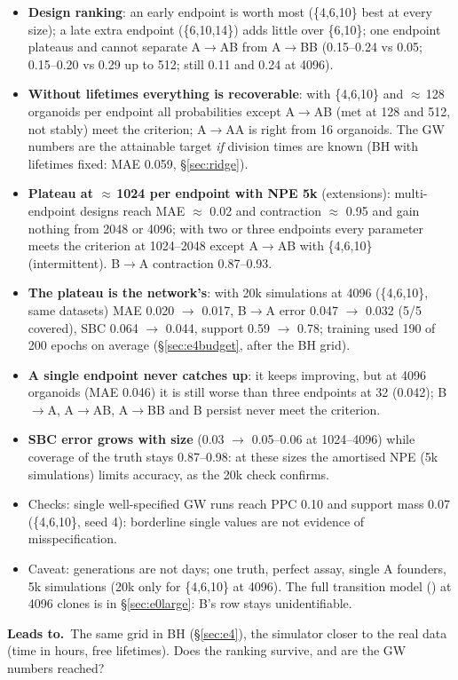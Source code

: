 \documentclass[10pt,a4paper]{article}
\newcommand{\code}[1]{\texttt{\detokenize{#1}}}
\newcommand{\blk}[1]{\par\needspace{5\baselineskip}\smallskip{\sffamily\bfseries\color{inkgray}#1}\par}
\newcommand{\Comment}{\blk{Comment}}
\newcommand{\Leads}[1]{\begin{leadbox}{\sffamily\bfseries\color{caqua!70!black}Leads to.}\ #1\end{leadbox}}
\renewcommand{\blk}[1]{\par\Needspace*{5\baselineskip}\smallskip{\sffamily\bfseries\color{inkgray}#1}\par}
\newcommand{\sref}[1]{\S\ref{#1}}
\begin{document}
\Comment
\begin{itemize}
\item \textbf{Design ranking}: an early endpoint is worth most (\{4,6,10\} best at every size); a late extra endpoint (\{6,10,14\}) adds little over \{6,10\}; one endpoint plateaus and cannot separate A$\to$AB from A$\to$BB (0.15--0.24 vs 0.05; 0.15--0.20 vs 0.29 up to 512; still 0.11 and 0.24 at 4096).
\item \textbf{Without lifetimes everything is recoverable}: with \{4,6,10\} and $\approx$\,128 organoids per endpoint all probabilities except A$\to$AB (met at 128 and 512, not stably) meet the criterion; A$\to$AA is right from 16 organoids. The GW numbers are the attainable target \emph{if} division times are known (BH with lifetimes fixed: MAE 0.059, \S\ref{sec:ridge}).
\item \textbf{Plateau at $\approx$\,1024 per endpoint with NPE 5k} (extensions): multi-endpoint designs reach MAE $\approx$ 0.02 and contraction $\approx$ 0.95 and gain nothing from 2048 or 4096; with two or three endpoints every parameter meets the criterion at 1024--2048 except A$\to$AB with \{4,6,10\} (intermittent). B$\to$A contraction 0.87--0.93.
\item \textbf{The plateau is the network's}: with 20k simulations at 4096 (\{4,6,10\}, same datasets) MAE 0.020 $\to$ 0.017, B$\to$A error 0.047 $\to$ 0.032 (5/5 covered), SBC 0.064 $\to$ 0.044, support 0.59 $\to$ 0.78; training used 190 of 200 epochs on average (\S\ref{sec:e4budget}, after the BH grid).
\item \textbf{A single endpoint never catches up}: it keeps improving, but at 4096 organoids (MAE 0.046) it is still worse than three endpoints at 32 (0.042); B$\to$A, A$\to$AB, A$\to$BB and B persist never meet the criterion.
\item \textbf{SBC error grows with size} (0.03 $\to$ 0.05--0.06 at 1024--4096) while coverage of the truth stays 0.87--0.98: at these sizes the amortised NPE (5k simulations) limits accuracy, as the 20k check confirms.
\item Checks: single well-specified GW runs reach PPC 0.10 and support mass 0.07 (\{4,6,10\}, seed 4): borderline single values are not evidence of misspecification.
\item Caveat: generations are not days; one truth, perfect assay, single A founders, 5k simulations (20k only for \{4,6,10\} at 4096). The full transition model (\code{law=two_type}) at 4096 clones is in \S\ref{sec:e0large}: B's row stays unidentifiable.
\end{itemize}
\Leads{The same grid in BH (\sref{sec:e4}), the simulator closer to the real data (time in hours, free lifetimes). Does the ranking survive, and are the GW numbers reached?}
\end{document}
